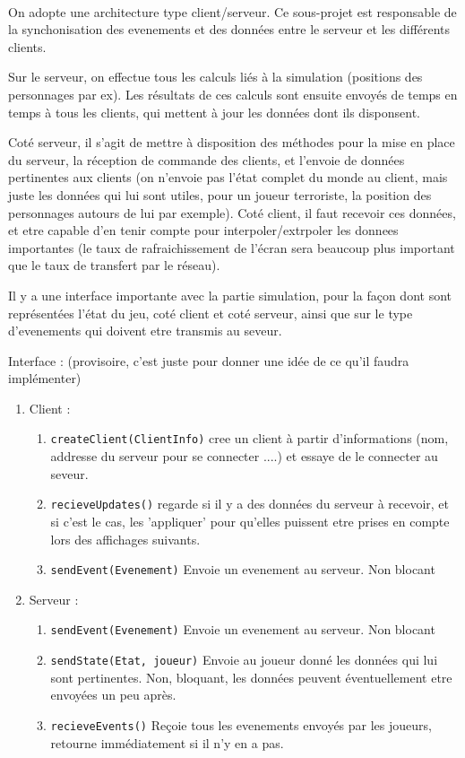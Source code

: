 \documentclass[a4paper,10pt]{article}
\begin{document}
\paragraph{}
On adopte une architecture type client/serveur. Ce sous-projet est responsable de la synchonisation des evenements et des données entre le serveur et les différents clients.

Sur le serveur, on effectue tous les calculs liés à la simulation (positions des personnages par ex). Les résultats de ces calculs sont ensuite envoyés de temps en temps à tous les clients, qui mettent à jour les données dont ils disponsent.

Coté serveur, il s'agit de mettre à disposition des méthodes pour la mise en place du serveur, la réception de commande des clients, et l'envoie de données pertinentes aux clients (on n'envoie pas l'état complet du monde au client, mais juste les données qui lui sont utiles, pour un joueur terroriste, la position des personnages autours de lui par exemple). Coté client, il faut recevoir ces données, et etre capable d'en tenir compte pour interpoler/extrpoler les donnees importantes (le taux de rafraichissement de l'écran sera beaucoup plus important que le taux de transfert par le réseau).

Il y a une interface importante avec la partie simulation, pour la façon dont sont représentées l'état du jeu, coté client et coté serveur, ainsi que sur le type d'evenements qui doivent etre transmis au seveur.

Interface : (provisoire, c'est juste pour donner une idée de ce qu'il faudra implémenter)
\begin{enumerate}
 \item Client : \begin{enumerate}
        \item \verb!createClient(ClientInfo)! cree un client à partir d'informations (nom, addresse du serveur pour se connecter ....) et essaye de le connecter au seveur.
        \item \verb!recieveUpdates()! regarde si il y a des données du serveur à recevoir, et si c'est le cas, les 'appliquer' pour qu'elles puissent etre prises en compte lors des affichages suivants.
        \item \verb!sendEvent(Evenement)! Envoie un evenement au serveur. Non blocant
       \end{enumerate}
\item Serveur : \begin{enumerate}
                 \item \verb!sendEvent(Evenement)! Envoie un evenement au serveur. Non blocant
                 \item \verb!sendState(Etat, joueur)! Envoie au joueur donné les données qui lui sont pertinentes. Non, bloquant, les données peuvent éventuellement etre envoyées un peu après.
                 \item \verb!recieveEvents()! Reçoie tous les evenements envoyés par les joueurs, retourne immédiatement si il n'y en a pas.
                \end{enumerate}

\end{enumerate}
\end{document}
